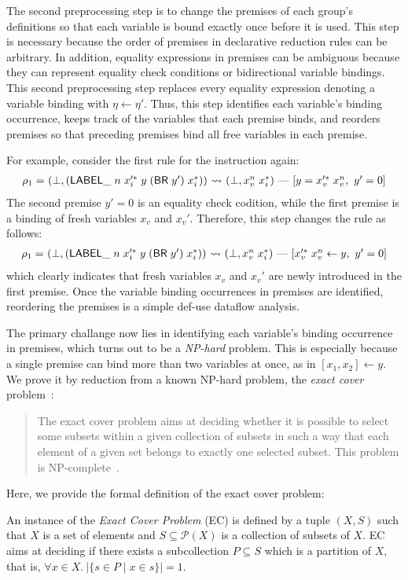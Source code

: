 \medskip
The second preprocessing step is to change the premises of each group's definitions
so that each variable is bound exactly once before it is used.
This step is necessary because the order of premises in declarative reduction rules
can be arbitrary.
In addition, equality expressions in premises can be ambiguous because they can represent equality check conditions or bidirectional variable bindings.
This second preprocessing step replaces every equality expression denoting a variable binding with $\eta \leftarrow \eta'$.
Thus, this step identifies each variable's binding occurrence,
keeps track of the variables that each premise binds,
and reorders premises so that preceding premises bind all free variables in each premise.

For example, consider the first rule for the  instruction again:
\[
\begin{array}{l@{~}l@{~}c@{~}l}
\rho_1 = &(\bot, (\ssf{LABEL\_} \; n \; x_i'^*\; y\; (\ssf{BR}\; y')\; x_i^*)) &\leadsto&
 (\bot, x_v^{n}\; x_i^*)\ \mbox{---}\ [y = x_v'^*\; x_v^{n},\ y' = 0]\\
\end{array}
\]
The second premise $y' = 0$ is an equality check codition,
while the first premise is a binding of fresh variables $x_v$ and $x_v'$.
Therefore, this step changes the rule as follows:
\[
\begin{array}{l@{~}l@{~}c@{~}l}
\rho_1 = &(\bot, (\ssf{LABEL\_} \; n \; x_i'^*\; y\; (\ssf{BR}\; y')\; x_i^*)) &\leadsto&
 (\bot, x_v^{n}\; x_i^*)\ \mbox{---}\ [x_v'^*\; x_v^{n} \leftarrow y,\ y' = 0]\\
\end{array}
\]
which clearly indicates that fresh variables $x_v$ and $x_v'$ are newly introduced in the first premise.
Once the variable binding occurrences in premises are identified,
reordering the premises is a simple def-use dataflow analysis.

The primary challange now lies in identifying each variable's binding occurrence in premises,
which turns out to be a \textit{NP-hard} problem.
This is especially because a single premise can bind more than two variables at once,
as in $[x_1, x_2] \leftarrow y$.
We prove it by reduction from a known NP-hard problem, the \textit{exact cover} problem~\cite{exactcover}:
\begin{quote}
The exact cover problem aims at deciding whether it is possible to select some subsets within a given collection of subsets in such a way that each element of a given set belongs to exactly one selected subset. This problem is NP-complete~\cite{karp72}.
\end{quote}
Here, we provide the formal definition of the exact cover problem:
\begin{definition}\label{def:exactcover}
An instance of the \textit{Exact Cover Problem} (EC) is defined by a tuple $(X, S)$
such that $X$ is a set of elements and $S \subseteq \mathcal{P}(X)$ is a collection of subsets of $X$.
EC aims at deciding if there exists a subcollection $P \subseteq S$ which is a partition of $X$,
that is, $\forall x \in X.\ |\{ s \in P \mid x \in s \}| = 1$.
\end{definition}

